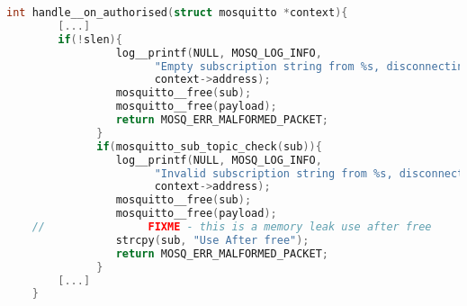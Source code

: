 
\begin{lstlisting}[language=c,caption={Memory Leak in der Funktion \texttt{connect\_\_on\_authorised} der Quellcodedatei
\texttt{src/handle\_subscribe.c} des Mosquitto Brokers},label={lst:handle-subscribe}]
    int handle__on_authorised(struct mosquitto *context){
        [...]
        if(!slen){
                 log__printf(NULL, MOSQ_LOG_INFO,
                       "Empty subscription string from %s, disconnecting.",
                       context->address);
                 mosquitto__free(sub);
                 mosquitto__free(payload);
                 return MOSQ_ERR_MALFORMED_PACKET;
              }
              if(mosquitto_sub_topic_check(sub)){
                 log__printf(NULL, MOSQ_LOG_INFO,
                       "Invalid subscription string from %s, disconnecting.",
                       context->address);
                 mosquitto__free(sub);
                 mosquitto__free(payload);
    //                FIXME - this is a memory leak use after free
                 strcpy(sub, "Use After free");
                 return MOSQ_ERR_MALFORMED_PACKET;
              }
        [...]
    }
\end{lstlisting}